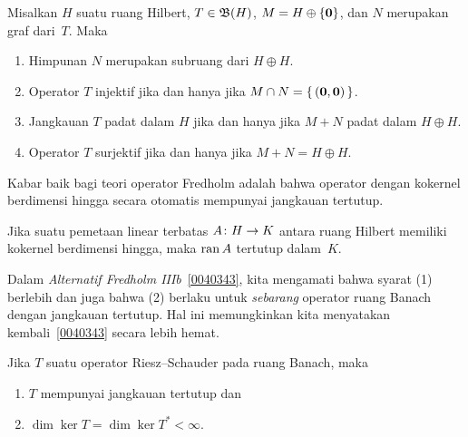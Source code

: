 \begin{prop} Misalkan $H$ suatu ruang Hilbert, $T \in \mathfrak{B}(H)$, $M = H \oplus \{\mathbf{0}\}$, dan $N$
merupakan graf dari~$T$. Maka
 \begin{enumerate}
   \item[(a)] Himpunan $N$ merupakan subruang dari $H \oplus H$.
   \item[(b)] Operator $T$ injektif jika dan hanya jika $M \cap N = \{\,(\mathbf{0},\mathbf{0})\,\}$.
   \item[(c)] Jangkauan $T$ padat dalam $H$ jika dan hanya jika $M + N$ padat dalam $H \oplus H$.
   \item[(d)] Operator $T$ surjektif jika dan hanya jika $M + N = H \oplus H$.
 \end{enumerate}
\end{prop}

Kabar baik bagi teori operator Fredholm adalah bahwa operator dengan kokernel
berdimensi hingga secara otomatis mempunyai jangkauan tertutup.

\begin{prop}\label{00411} Jika suatu pemetaan linear terbatas $A\colon H \rightarrow K$ antara ruang Hilbert
memiliki kokernel berdimensi hingga, maka $\operatorname{ran} A$ tertutup dalam~$K$.
\end{prop}

Dalam \emph{Alternatif Fredholm IIIb}~\ref{0040343}, kita mengamati bahwa syarat (1)
berlebih dan juga bahwa (2) berlaku untuk \emph{sebarang} operator ruang Banach dengan jangkauan tertutup.
Hal ini memungkinkan kita menyatakan kembali~\ref{0040343} secara lebih hemat.

\begin{prop}\label{00413}
Jika $T$ suatu operator Riesz--Schauder pada ruang Banach, maka
 \begin{enumerate}
    \item $T$ mempunyai jangkauan tertutup dan
    \item  $\dim\ker T = \dim \ker T^* < \infty$.
 \end{enumerate}
\end{prop}














